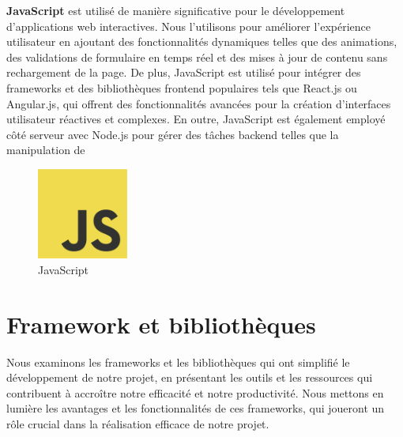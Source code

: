 \textbf{JavaScript} est utilisé de manière significative pour le développement d'applications web interactives. Nous l'utilisons pour améliorer l'expérience utilisateur en ajoutant des fonctionnalités dynamiques telles que des animations, des validations de formulaire en temps réel et des mises à jour de contenu sans rechargement de la page. De plus, JavaScript est utilisé pour intégrer des frameworks et des bibliothèques frontend populaires tels que React.js ou Angular.js, qui offrent des fonctionnalités avancées pour la création d'interfaces utilisateur réactives et complexes. En outre, JavaScript est également employé côté serveur avec Node.js pour gérer des tâches backend telles que la manipulation de
\\
\begin{figure}[H]
    \centering
    \includegraphics[width=3cm]{Figures/javascript.png}
    \caption{JavaScript}
\end{figure}






\section{Framework et bibliothèques}

\hspace{\parindent}Nous examinons les frameworks et les bibliothèques qui ont simplifié le développement de notre projet, en présentant les outils et les ressources qui contribuent à accroître notre efficacité et notre productivité. Nous mettons en lumière les avantages et les fonctionnalités de ces frameworks, qui joueront un rôle crucial dans la réalisation efficace de notre projet.


